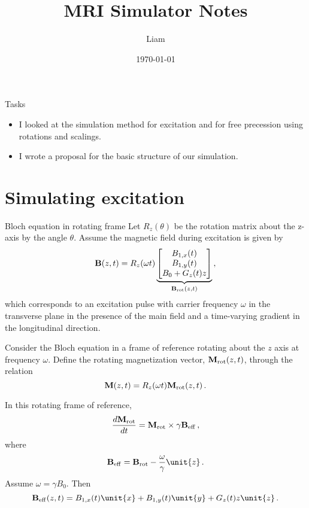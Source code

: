 \documentclass{beamer}
\title{MRI Simulator Notes}
\author{Liam}
\date{\today}
\begin{document}
\begin{frame}
\maketitle
\end{frame}

\begin{frame}{Tasks}
\begin{itemize}
\item I looked at the simulation method for excitation and for free precession using rotations and scalings.
\item I wrote a proposal for the basic structure of our simulation.
\end{itemize}
\end{frame}

\section{Simulating excitation}

\begin{frame}{Bloch equation in rotating frame}
Let $R_z(\theta)$ be the rotation matrix about the z-axis by the angle $\theta$. Assume the magnetic field during excitation is given by
\begin{equation*}
\mathbf{B}(z,t) = R_z(\omega t) \underbrace{\begin{bmatrix}B_{1,x}(t)\\B_{1,y}(t)\\B_0+G_z(t)z\end{bmatrix}}_{\mathbf{B}_{\rm rot}(z,t)}\,,
\end{equation*}
which corresponds to an excitation pulse with carrier frequency $\omega$ in the transverse plane in the presence of the main field and a time-varying gradient in the longitudinal direction.
\end{frame}

\begin{frame}
Consider the Bloch equation in a frame of reference rotating about the $z$ axis at frequency $\omega$. Define the rotating magnetization vector, $\mathbf{M}_{\rm rot}(z,t)$, through the relation
\begin{equation*}
\mathbf{M}(z,t) = R_z(\omega t)\mathbf{M}_{\rm rot}(z,t)\,.
\end{equation*}

In this rotating frame of reference,
\begin{equation*}
\frac{d\mathbf{M}_{\rm rot}}{dt} = \mathbf{M}_{\rm rot} \times \gamma \mathbf{B}_{\rm eff}\,,
\end{equation*}
where
\begin{equation*}
\mathbf{B}_{\rm eff} = \mathbf{B}_{\rm rot} - \frac{\omega}{\gamma}\unit{z}\,.
\end{equation*}
Assume $\omega = \gamma B_0$. Then
\begin{equation*}
\mathbf{B}_{\rm eff}(z,t) = B_{1,x}(t)\unit{x}+B_{1,y}(t)\unit{y}+G_z(t)z\unit{z}\,.
\end{equation*}
\end{frame}
\end{document}

